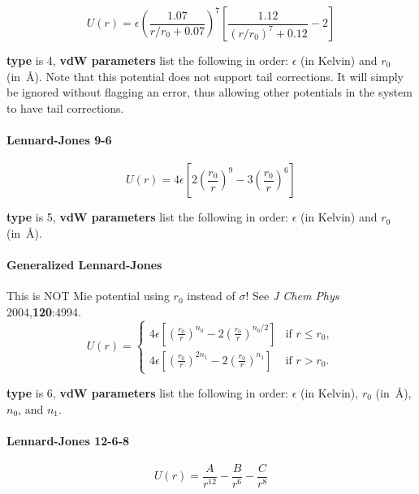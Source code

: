 \documentclass[12pt,letterpaper]{article}
\begin{document}
\begin{equation}
U(r) = \epsilon \left( \frac{1.07}{r/r_0+0.07} \right)^7
\left[ \frac{1.12}{(r/r_0)^7+0.12}-2 \right]
\end{equation}

{\bf type} is 4, {\bf vdW parameters} list the following in
order: $\epsilon$ (in Kelvin) and $r_0$ (in~\AA). Note that
this potential does not support tail corrections. It will
simply be ignored without flagging an error, thus allowing
other potentials in the system to have tail corrections.

\paragraph{Lennard-Jones 9-6}
\begin{equation}
U(r) = 4 \epsilon \left[2\left(\frac{r_0}{r}\right)^9
-3\left(\frac{r_0}{r}\right)^6 \right]
\end{equation}

{\bf type} is 5, {\bf vdW parameters} list the following in order:
$\epsilon$ (in Kelvin) and $r_0$ (in~\AA).

\paragraph{Generalized Lennard-Jones}
This is NOT Mie potential using $r_0$ instead of $\sigma$!
See \textit{J Chem Phys} 2004,\textbf{120}:4994.
\begin{equation}
U(r) = \left\{
\begin{array}{rl}
4 \epsilon \left[\left(\frac{r_0}{r}\right)^{n_0}
-2\left(\frac{r_0}{r}\right)^{n_0/2} \right] & \text{if } r \leq r_0, \\
4 \epsilon \left[\left(\frac{r_0}{r}\right)^{2n_1}
-2\left(\frac{r_0}{r}\right)^{n_1} \right] & \text{if } r>r_0.
\end{array} \right.
\end{equation}

{\bf type} is 6, {\bf vdW parameters} list the following in
order: $\epsilon$ (in Kelvin), $r_0$ (in~\AA), $n_0$, and
$n_1$.

\paragraph{Lennard-Jones 12-6-8}
\begin{equation}
U(r) = \frac{A}{r^{12}} - \frac{B}{r^6} - \frac{C}{r^8}
\end{equation}
\end{document}
